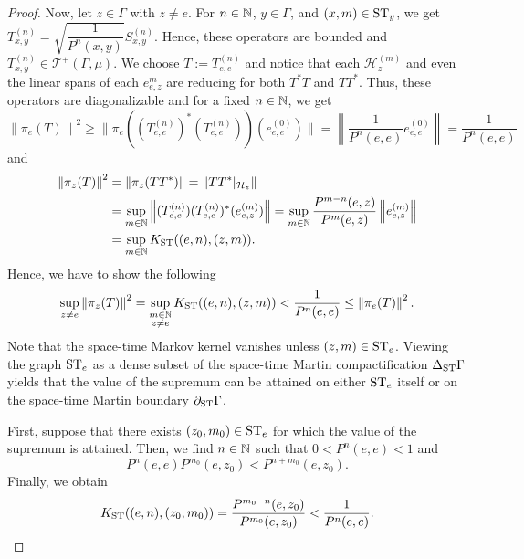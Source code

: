 \documentclass[12pt, class = article, crop = false, a4paper, twoside]{standalone}
\begin{document}
\begin{proof}
    Now, let $z\in\Gamma$ with $z\neq e$. For $n\in\mathbb{N}$, $y\in\Gamma$, and $(x, m)\in\operatorname{ST}_{y}$, we get $T^{(n)}_{x, y} = \sqrt{\dfrac{1}{P^{n}(x, y)}}S^{(n)}_{x, y}$. Hence, these operators are bounded and $T^{(n)}_{x, y}\in\mathcal{T}^{+}(\Gamma, \mu)$. We choose $T := T^{(n)}_{e, e}$ and notice that each $\mathcal{H}^{(m)}_{z}$ and even the linear spans of each $e^{m}_{e, z}$ are reducing for both $T^{\ast}T$ and $TT^{\ast}$. Thus, these operators are diagonalizable and for a fixed $n\in\mathbb{N}$, we get
    \begin{equation*}
        \left\|\pi_{e}(T)\right\|^{2} \geq \|\pi_{e}((T^{(n)}_{e, e})^{\ast}(T^{(n)}_{e, e}))(e^{(0)}_{e, e})\| = \left\|\dfrac{1}{P^{n}(e, e)}e^{(0)}_{e, e}\right\| = \dfrac{1}{P^{n}(e, e)}
    \end{equation*}
    and
    \begin{equation*}
        \begin{split}
            \left\|\pi_{z}(T)\right\|^{2} & = \|\pi_{z}(TT^{\ast})\| = \left\|TT^{\ast}|_{\mathcal{H}_{z}}\right\| \\
            & = \sup_{m\in\mathbb{N}}\left\|(T^{(n)}_{e, e})(T^{(n)}_{e, e})^{\ast}(e^{(m)}_{e, z})\right\| = \sup_{m\in\mathbb{N}}\dfrac{P^{m - n}(e, z)}{P^{m}(e, z)}\left\|e^{(m)}_{e, z}\right\| \\
            & = \sup_{m\in\mathbb{N}}K_{\operatorname{ST}}((e, n), (z, m)).
        \end{split}
    \end{equation*}
    Hence, we have to show the following
    \begin{equation*}
        \sup_{z\neq e}\left\|\pi_{z}(T)\right\|^{2} = \sup_{\substack{m\in\mathbb{N} \\ z\neq e}}K_{\operatorname{ST}}((e, n), (z, m)) < \dfrac{1}{P^{n}(e, e)} \leq \left\|\pi_{e}(T)\right\|^{2}.
    \end{equation*}
    Note that the space-time Markov kernel vanishes unless $(z, m)\in\operatorname{ST}_{e}$. Viewing the graph $\operatorname{ST}_{e}$ as a dense subset of the space-time Martin compactification $\Delta_{\operatorname{ST}}\Gamma$ yields that the value of the supremum can be attained on either $\operatorname{ST}_{e}$ itself or on the space-time Martin boundary $\partial_{\operatorname{ST}}\Gamma$. 
    
    First, suppose that there exists $(z_{0}, m_{0})\in\operatorname{ST}_{e}$ for which the value of the supremum is attained. Then, we find $n\in\mathbb{N}$ such that $0 < P^{n}(e, e) < 1$ and
    \begin{equation*}
        P^{n}(e, e)P^{m_{0}}(e, z_{0}) < P^{n + m_{0}}(e, z_{0}).
    \end{equation*}
    Finally, we obtain
    \begin{equation*}
        K_{\operatorname{ST}}((e, n), (z_{0}, m_{0})) = \dfrac{P^{m_{0} - n}(e, z_{0})}{P^{m_{0}}(e, z_{0})} < \dfrac{1}{P^{n}(e, e)}.
    \end{equation*}
    

\end{proof}
\end{document}
